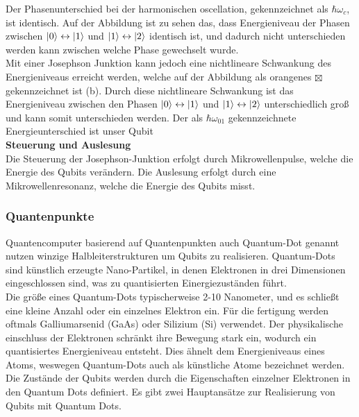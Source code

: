 Der Phasenunterschied bei der harmonischen oscellation, gekennzeichnet als $\hbar\omega_c$, ist identisch. Auf der Abbildung ist zu sehen das, dass Energieniveau der Phasen zwischen $\ket{0} \leftrightarrow \ket{1}$
und $\ket{1} \leftrightarrow \ket{2}$ identisch ist, und dadurch nicht unterschieden werden kann zwischen welche Phase gewechselt wurde.\\

Mit einer Josephson Junktion kann jedoch eine nichtlineare Schwankung des Energieniveaus erreicht werden, welche auf der Abbildung als orangenes $\boxtimes$ gekennzeichnet ist (b).
Durch diese nichtlineare Schwankung ist das Energieniveau zwischen den Phasen $\ket{0} \leftrightarrow \ket{1}$ und $\ket{1} \leftrightarrow \ket{2}$ unterschiedlich groß und kann somit unterschieden werden.
Der als $\hbar\omega_{01}$ gekennzeichnete Energieunterschied ist unser Qubit\\

\textbf{Steuerung und Auslesung}\\
Die Steuerung der Josephson-Junktion erfolgt durch Mikrowellenpulse, welche die Energie des Qubits verändern. Die Auslesung erfolgt durch eine Mikrowellenresonanz, welche die Energie des Qubits misst.\\

\subsubsection{Quantenpunkte}
\label{subsub:quantenpunkte}
Quantencomputer basierend auf Quantenpunkten auch Quantum-Dot genannt nutzen winzige Halbleiterstrukturen um Qubits zu realisieren.
Quantum-Dots sind künstlich erzeugte Nano-Partikel, in denen Elektronen in drei Dimensionen eingeschlossen sind, was zu quantisierten Einergiezuständen führt.\\

Die größe eines Quantum-Dots typischerweise 2-10 Nanometer, und es schließt eine kleine Anzahl oder ein einzelnes Elektron ein.
Für die fertigung werden oftmals Galliumarsenid (GaAs) oder Silizium (Si) verwendet. Der physikalische einschluss der Elektronen schränkt ihre
Bewegung stark ein, wodurch ein quantisiertes Energieniveau entsteht. Dies ähnelt dem Energieniveaus eines Atoms, weswegen Quantum-Dots auch als künstliche Atome bezeichnet werden.\\

Die Zustände der Qubits werden durch die Eigenschaften einzelner Elektronen in den Quantum Dots definiert. Es gibt zwei Hauptansätze zur Realisierung von Qubits mit Quantum Dots.\\

